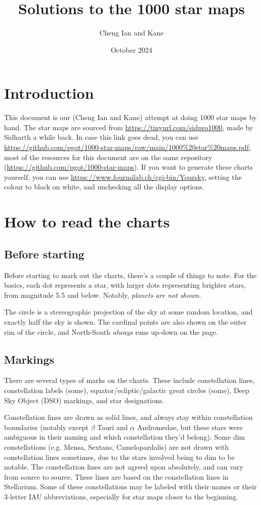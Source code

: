 \documentclass{article}
\title{Solutions to the 1000 star maps}
\author{Cheng Ian and Kane}
\date{October 2024}
\begin{document}
\begin{titlingpage}
\maketitle
\end{titlingpage}

\section{Introduction}
This document is our (Cheng Ian and Kane) attempt at doing 1000 star maps by hand. The star maps are sourced from \url{https://tinyurl.com/sidpro1000}, made by Sidharth a while back. In case this link goes dead, you can use \url{https://github.com/pgot/1000-star-maps/raw/main/1000%20star%20maps.pdf}; most of the resources for this document are on the same repository (\url{https://github.com/pgot/1000-star-maps}). If you want to generate these charts yourself, you can use \url{https://www.fourmilab.ch/cgi-bin/Yoursky}, setting the colour to black on white, and unchecking all the display options.

\section{How to read the charts}
\subsection{Before starting}
Before starting to mark out the charts, there's a couple of things to note. For the basics, each dot represents a star, with larger dots representing brighter stars, from magnitude 5.5 and below. Notably, \textit{planets are not shown.}

The circle is a stereographic projection of the sky at some random location, and exactly half the sky is shown. The cardinal points are also shown on the outer rim of the circle, and North-South \textit{always} runs up-down on the page.
\subsection{Markings}
There are several types of marks on the charts. These include constellation lines, constellation labels (some), equator/ecliptic/galactic great circles (some), Deep Sky Object (DSO) markings, and star designations.

Constellation lines are drawn as solid lines, and always stay within constellation boundaries (notably except \(\beta\) Tauri and \(\alpha\) Andromedae, but these stars were ambiguous in their naming and which constellation they'd belong). Some dim constellations (e.g. Mensa, Sextans, Camelopardalis) are not drawn with constellation lines sometimes, due to the stars involved being to dim to be notable. The constellation lines are not agreed upon absolutely, and can vary from source to source. These lines are based on the constellation lines in Stellarium. Some of these constellations may be labeled with their names or their 3-letter IAU abbreviations, especially for star maps closer to the beginning.
\end{document}
